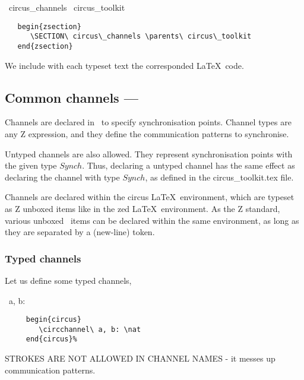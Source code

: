 \documentclass{article}
\begin{document}
\begin{zsection}
  \SECTION\ circus\_channels \parents\ circus\_toolkit
\end{zsection}
%
\begin{verbatim}
   begin{zsection}
      \SECTION\ circus\_channels \parents\ circus\_toolkit
   end{zsection}
\end{verbatim}
%
We include with each typeset text the corresponded \LaTeX\ code.


\subsection{Common channels --- }

Channels are declared in \Circus\ to specify synchronisation points. Channel
types are any Z expression, and they define the communication patterns to
synchronise.

Untyped channels are also allowed. They represent synchronisation points with
the given type $Synch$. Thus, declaring a untyped channel has the same effect
as declaring the channel with type $Synch$, as defined in the
\textsf{circus\_toolkit.tex} file.

Channels are declared within the \textsf{circus} \LaTeX\ environment, which are
typeset as Z unboxed items like in the \textsf{zed} \LaTeX\ environment. As the
Z standard, various unboxed \Circus\ items can be declared within the same
environment, as long as they are separated by a  (new-line) token.

\subsubsection{Typed channels}

Let us define some typed channels,
%
\begin{circus}
  \circchannel\ a, b: \nat
\end{circus}%
%
\begin{verbatim}
     begin{circus}
        \circchannel\ a, b: \nat
     end{circus}%
\end{verbatim}
%

STROKES ARE NOT ALLOWED IN CHANNEL NAMES - it messes up communication patterns.
\end{document}
